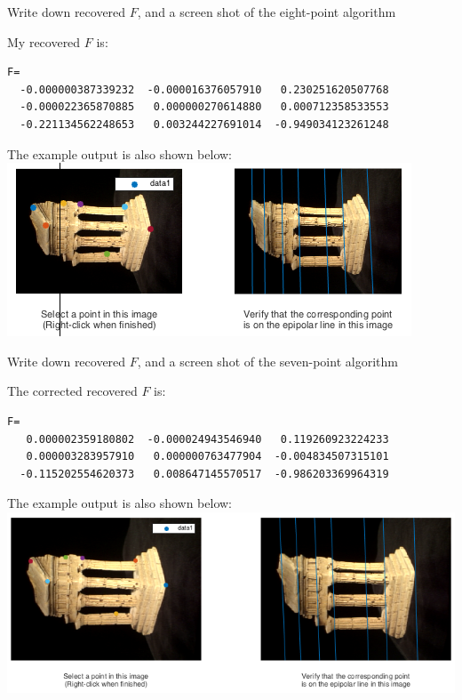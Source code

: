 \documentclass[12pt,letterpaper,boxed]{hmcpset}
\begin{document}
\begin{problem}[2.1]
Write down recovered $F$, and a screen shot of the eight-point algorithm
\end{problem}
\begin{solution}
My recovered $F$ is:
\begin{verbatim} 
F=
  -0.000000387339232  -0.000016376057910   0.230251620507768
  -0.000022365870885   0.000000270614880   0.000712358533553
  -0.221134562248653   0.003244227691014  -0.949034123261248
\end{verbatim}
The example output is also shown below:\\
\includegraphics[width=\textwidth]{q2_1.png}
\end{solution}

\begin{problem}[2.2]
Write down recovered $F$, and a screen shot of the seven-point algorithm
\end{problem}
\begin{solution}
The corrected recovered $F$ is:
\begin{verbatim} 
F=
   0.000002359180802  -0.000024943546940   0.119260923224233
   0.000003283957910   0.000000763477904  -0.004834507315101
  -0.115202554620373   0.008647145570517  -0.986203369964319
\end{verbatim}
The example output is also shown below:\\
\includegraphics[width=\textwidth]{q2_2.png}
\end{solution}
\end{document}
